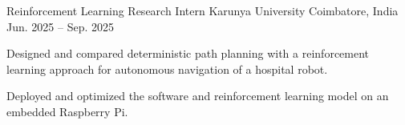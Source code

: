 \begin{cventries}
  \cventry
    {Reinforcement Learning Research Intern}
    {Karunya University}
    {Coimbatore, India}
    {Jun. 2025 -- Sep. 2025}
    {
      \begin{cvitems}
        \item {Designed and compared deterministic path planning with a reinforcement learning approach for autonomous navigation of a hospital robot.}
        \item {Deployed and optimized the software and reinforcement learning model on an embedded Raspberry Pi.}
      \end{cvitems}
    }
\end{cventries}
